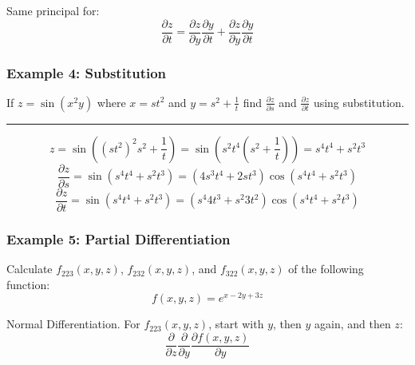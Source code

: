 Same principal for:
$${\frac{\partial z}{\partial t}}={\frac{\partial z}{\partial y}}{\frac{\partial y}{\partial t}}+{\frac{\partial z}{\partial y}}{\frac{\partial y}{\partial t}}$$


\subsubsection{Example 4: Substitution}
If $z=\sin(x^2y)$ where $x=st^2$ and $y=s^2+\frac{1}{t}$ find $\frac{\partial z}{\partial s}$ and $\frac{\partial z}{\partial t}$ using substitution.

\noindent\rule{\textwidth}{1pt}

$$z=\sin\left((st^2)^2s^2+\frac{1}{t}\right)=\sin\left(s^2t^4(s^2+\frac{1}{t})\right)=s^4t^4+s^2t^3$$
$$\frac{\partial z}{\partial s}=\sin(s^4t^4+s^2t^3)=(4s^3t^4+2st^3)\cos(s^4t^4+s^2t^3)$$
$$\frac{\partial z}{\partial t}=\sin(s^4t^4+s^2t^3)=(s^4 4t^3+s^2 3t^2)\cos(s^4t^4+s^2t^3)$$

\subsubsection{Example 5: Partial Differentiation}
Calculate $f_{223}(x,y,z)$, $f_{232}(x,y,z)$, and $f_{322}(x,y,z)$ of the following function:
$$f(x,y,z)=e^{x-2y+3z}$$

Normal Differentiation. For $f_{223}(x,y,z)$, start with $y$, then $y$ again, and then $z$:
$$\frac{\partial }{\partial z}\frac{\partial }{\partial y}\frac{\partial f(x,y,z)}{\partial y}$$
